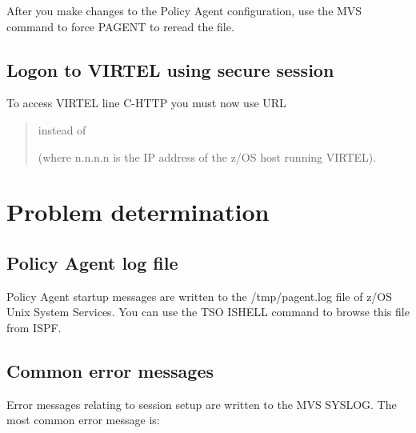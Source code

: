 \documentclass[letterpaper,10pt,english]{sphinxmanual}
\begin{document}
After you make changes to the Policy Agent configuration, use the MVS command  to force PAGENT to reread the file.


\subsection{Logon to VIRTEL using secure session}
\label{\detokenize{connectivity_guide:logon-to-virtel-using-secure-session}}
To access VIRTEL line C-HTTP you must now use URL
\begin{quote}

 instead of 

(where n.n.n.n is the IP address of the z/OS host running VIRTEL).
\end{quote}

\newpage


\section{Problem determination}
\label{\detokenize{connectivity_guide:index-159}}\label{\detokenize{connectivity_guide:problem-determination}}

\subsection{Policy Agent log file}
\label{\detokenize{connectivity_guide:policy-agent-log-file}}
Policy Agent startup messages are written to the /tmp/pagent.log file of z/OS Unix System Services. You can use the TSO ISHELL command to browse this file from ISPF.


\subsection{Common error messages}
\label{\detokenize{connectivity_guide:common-error-messages}}
Error messages relating to session setup are written to the MVS SYSLOG. The most common error message is:
\end{document}
